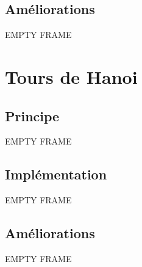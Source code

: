 \documentclass{beamer}%
\begin{document}
		\subsection{Améliorations}
			\begin{frame}
				EMPTY FRAME
			\end{frame}
			
	\section{Tours de Hanoi}
		\subsection{Principe}
			\begin{frame}
				EMPTY FRAME
			\end{frame}
			
		\subsection{Implémentation}
			\begin{frame}
				EMPTY FRAME
			\end{frame}
			
		\subsection{Améliorations}
			\begin{frame}
				EMPTY FRAME
			\end{frame}
			
\end{document}
